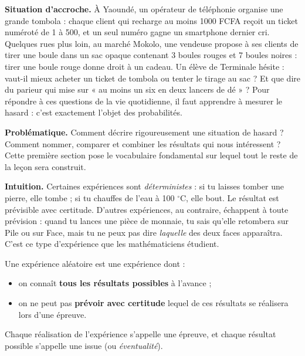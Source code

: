 \documentclass[11pt]{article}
\newcommand{\cle}[1]{{\popxbold\color{popdark}#1}}
\newcounter{popsec}
\newcounter{popsub}
\newcommand{\courssub}[1]{%
  \stepcounter{popsub}%
  \par\vspace{9pt}\noindent{\popxbold\fontsize{11.5}{13}\selectfont\color{popink}{\color{poporange}\thepopsec.\thepopsub}\hspace{6pt}#1}\par\nopagebreak\vspace{4pt}
}
\begin{document}
\textbf{Situation d'accroche.} À Yaoundé, un opérateur de téléphonie organise une grande tombola : chaque client qui recharge au moins 1000 FCFA reçoit un ticket numéroté de 1 à 500, et un seul numéro gagne un smartphone dernier cri. Quelques rues plus loin, au marché Mokolo, une vendeuse propose à ses clients de tirer une boule dans un sac opaque contenant 3 boules rouges et 7 boules noires : tirer une boule rouge donne droit à un cadeau. Un élève de Terminale hésite : vaut-il mieux acheter un ticket de tombola ou tenter le tirage au sac ? Et que dire du parieur qui mise sur « au moins un six en deux lancers de dé » ? Pour répondre à ces questions de la vie quotidienne, il faut apprendre à \cle{mesurer le hasard} : c'est exactement l'objet des probabilités.

\textbf{Problématique.} Comment décrire rigoureusement une situation de hasard ? Comment nommer, comparer et combiner les résultats qui nous intéressent ? Cette première section pose le vocabulaire fondamental sur lequel tout le reste de la leçon sera construit.

\courssub{Notion d'expérience aléatoire}

\textbf{Intuition.} Certaines expériences sont \emph{déterministes} : si tu laisses tomber une pierre, elle tombe ; si tu chauffes de l'eau à 100 $^{\circ}$C, elle bout. Le résultat est prévisible avec certitude. D'autres expériences, au contraire, échappent à toute prévision : quand tu lances une pièce de monnaie, tu sais qu'elle retombera sur Pile ou sur Face, mais tu ne peux pas dire \emph{laquelle} des deux faces apparaîtra. C'est ce type d'expérience que les mathématiciens étudient.

\begin{definition}
Une \cle{expérience aléatoire} est une expérience dont :
\begin{itemize}
\item on connaît \textbf{tous les résultats possibles} à l'avance ;
\item on ne peut pas \textbf{prévoir avec certitude} lequel de ces résultats se réalisera lors d'une épreuve.
\end{itemize}
Chaque réalisation de l'expérience s'appelle une \cle{épreuve}, et chaque résultat possible s'appelle une \cle{issue} (ou \emph{éventualité}).
\end{definition}
\end{document}
